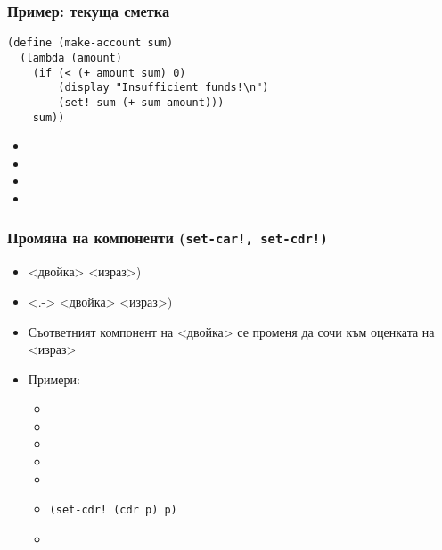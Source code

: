 \documentclass{beamer}
\begin{document}
\begin{frame}[fragile]
  \frametitle{Пример: текуща сметка}

\begin{lstlisting}
(define (make-account sum)
  (lambda (amount)
    (if (< (+ amount sum) 0)
        (display "Insufficient funds!\n")
        (set! sum (+ sum amount)))
    sum))
\end{lstlisting}
  \onslide<+->
  \begin{itemize}[<+->]
  \item {}
  \item {}
  \item {}
  \item {}
  \end{itemize}
\end{frame}

\begin{frame}
  \frametitle{Промяна на компоненти (\tt{set-car!}, \tt{set-cdr!})}

  \begin{itemize}[<+->]
  \item {}<двойка> <израз>\tta)
  \item<.-> <двойка> <израз>\tta)
  \item Съответният компонент на <двойка> се променя да сочи към оценката на <израз>
  \item Примери:
    \begin{itemize}
    \item {}
    \item {}
    \item {}
    \item {}
    \item {}
    \item \tt{(set-cdr! (cdr p) p)}
    \item {}
    \end{itemize}
  \end{itemize}
\end{frame}
\end{document}
